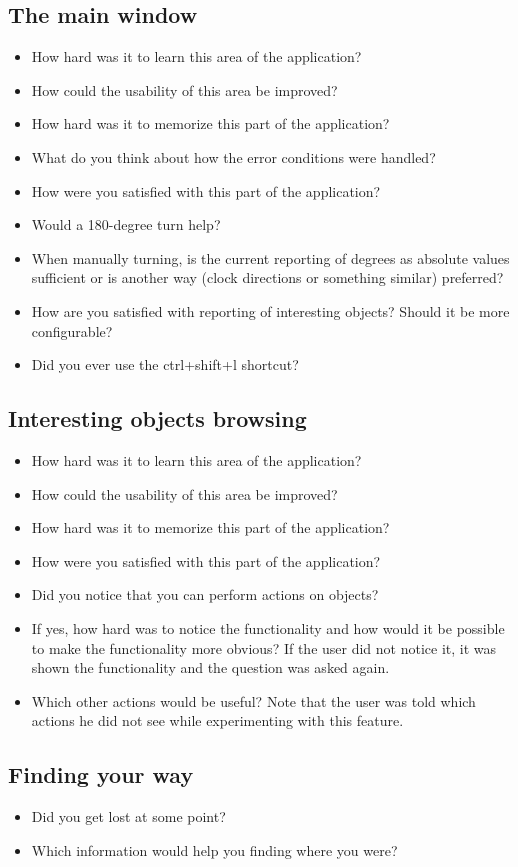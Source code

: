 \documentclass[nolof,digital]{fithesis3}
\begin{document}
\subsection{The main window}
\begin{itemize}
\item How hard was it to learn this area of the application?
\item How could the usability of this area be improved?
\item How hard was it to memorize this part of the application?
\item What do you think about how the error conditions were handled?
\item How were you satisfied with this part of the application?
\item Would a 180-degree turn help?
\item When manually turning, is the current reporting of degrees as absolute values sufficient or is another way (clock directions or something similar) preferred?
\item How are you satisfied with reporting of interesting objects? Should it be more configurable?
\item Did you ever use the ctrl+shift+l shortcut?
\end{itemize}
\subsection{Interesting objects browsing}
\begin{itemize}
\item How hard was it to learn this area of the application?
\item How could the usability of this area be improved?
\item How hard was it to memorize this part of the application?
\item How were you satisfied with this part of the application?
\item Did you notice that you can perform actions on objects?
\item If yes, how hard was to notice the functionality and how would it be possible to make the functionality more obvious? If the user did not notice it, it was shown the functionality and the question was asked again.
\item Which other actions would be useful? Note that the user was told which actions he did not see while experimenting with this feature.
\end{itemize}
\subsection{Finding your way}
\begin{itemize}
\item Did you get lost at some point?
\item Which information would help you finding where you were?
\end{itemize}
\end{document}
